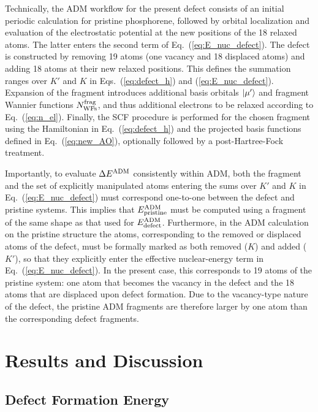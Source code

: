 \documentclass[aip,jcp,reprint]{revtex4-2}
\begin{document}
Technically, the ADM workflow for the present defect consists of an initial periodic calculation for pristine phosphorene, followed by orbital localization and evaluation of the electrostatic potential at the new positions of the 18 relaxed atoms. The latter enters the second term of Eq.~(\ref{eq:E_nuc_defect}). The defect is constructed by removing 19 atoms (one vacancy and 18 displaced atoms) and adding 18 atoms at their new relaxed positions. This defines the summation ranges over $K'$ and $K$ in Eqs.~(\ref{eq:defect_h}) and (\ref{eq:E_nuc_defect}). Expansion of the fragment introduces additional basis orbitals $\ket{\mu'}$ and fragment Wannier functions $N_{\rm WFs}^{\rm frag}$, and thus additional electrons to be relaxed according to Eq.~(\ref{eq:n_el}). Finally, the SCF procedure is performed for the chosen fragment using the Hamiltonian in Eq.~(\ref{eq:defect_h}) and the projected basis functions defined in Eq.~(\ref{eq:new_AO}), optionally followed by a post-Hartree-Fock treatment.



Importantly, to evaluate $\Delta E^{\rm ADM}$ consistently within ADM, both the fragment and the set of explicitly manipulated atoms entering the sums over $K'$ and $K$ in Eq.~(\ref{eq:E_nuc_defect}) must correspond one-to-one between the defect and pristine systems. This implies that $E^{\rm ADM}_{\rm pristine}$ must be computed using a fragment of the same shape as that used for $E^{\rm ADM}_{\rm defect}$. Furthermore, in the ADM calculation on the pristine structure the atoms, corresponding to the removed or displaced atoms of the defect, must be formally marked as both removed ($K$) and added ($K'$), so that they explicitly enter the effective nuclear-energy term in Eq.~(\ref{eq:E_nuc_defect}). In the present case, this corresponds to 19 atoms of the pristine system: one atom that becomes the vacancy in the defect and the 18 atoms that are displaced upon defect formation.
Due to the vacancy-type nature of the defect, the pristine ADM fragments are therefore larger by one atom than the corresponding defect fragments. 




\section{Results and Discussion}

\subsection{Defect Formation Energy}
\end{document}
